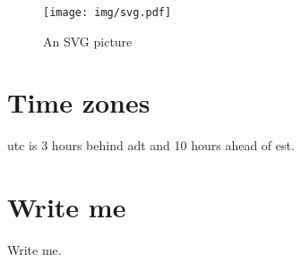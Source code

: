 \documentclass{article}
\begin{document}

\begin{figure}[!ht]
  \caption{An SVG picture}
  \centering
    \texttt{[image: img/svg.pdf]}
\end{figure}

% 


\section{Time zones}
\gls{utc} is 3 hours behind \gls{adt} and 10 hours ahead of \gls{est}.

\section{Write me}
\label{sec:write-me}
Write me.~\cite{www:pdflatex-makefile}

\printbibliography[title=Sources] %

\printglossaries
\end{document}
